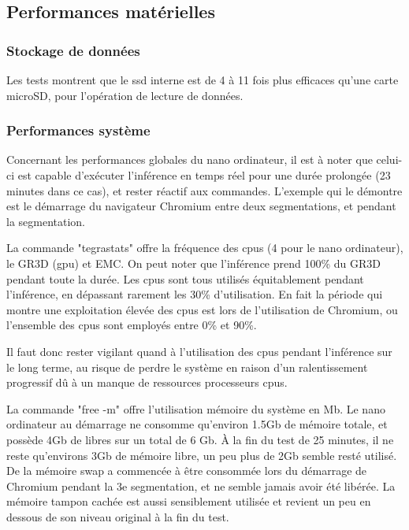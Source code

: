 ﻿\subsection{Performances matérielles}
\subsubsection{Stockage de données}
\par Les tests montrent que le \acrshort{ssd} interne est de 4 à 11 fois plus efficaces qu'une carte microSD, pour l'opération de lecture de données. 
\subsubsection{Performances système}
\par Concernant les performances globales du nano ordinateur, il est à noter que celui-ci est capable d'exécuter l'inférence en temps réel pour une durée prolongée (23 minutes dans ce cas), et rester réactif aux commandes. L'exemple qui le démontre est le démarrage du navigateur Chromium entre deux segmentations, et pendant la segmentation.
\par La commande "tegrastats" offre la fréquence des \acrshort{cpu}s (4 pour le nano ordinateur), le GR3D (\acrshort{gpu}) et EMC. On peut noter que l'inférence prend 100\% du GR3D pendant toute la durée. Les \acrshort{cpu}s sont tous utilisés équitablement pendant l'inférence, en dépassant rarement les 30\% d'utilisation. En fait la période qui montre une exploitation élevée des \acrshort{cpu}s est lors de l'utilisation de Chromium, ou l'ensemble des \acrshort{cpu}s sont employés entre 0\% et 90\%. 
\par Il faut donc rester vigilant quand à l'utilisation des \acrshort{cpu}s pendant l'inférence sur le long terme, au risque de perdre le système en raison d'un ralentissement progressif dû à un manque de ressources processeurs \acrshort{cpu}s.
\par La commande "free -m" offre l'utilisation mémoire du système en Mb. Le nano ordinateur au démarrage ne consomme qu'environ 1.5Gb de mémoire totale, et possède 4Gb de libres sur un total de 6 Gb. À la fin du test de 25 minutes, il ne reste qu'environs 3Gb de mémoire libre, un peu plus de 2Gb semble resté utilisé. De la mémoire swap a commencée à être consommée lors du démarrage de Chromium pendant la 3e segmentation, et ne semble jamais avoir été libérée. La mémoire tampon cachée est aussi sensiblement utilisée et revient un peu en dessous de son niveau original à la fin du test. 
